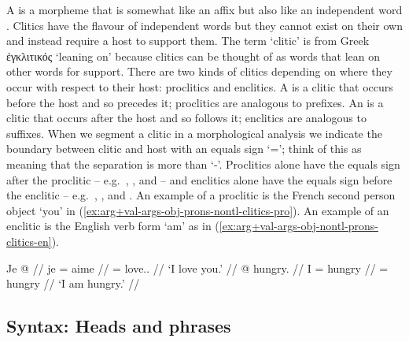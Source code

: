 A  is a morpheme that is somewhat like an affix but also like an independent word \parencite[166]{booij:2007}. Clitics have the flavour of independent words but they cannot exist on their own and instead require a host to support them. The term ‘clitic’ is from Greek ἐγκλιτικός  ‘leaning on’ because clitics can be thought of as words that lean on other words for support. There are two kinds of clitics depending on where they occur with respect to their host: proclitics and enclitics. A  is a clitic that occurs before the host and so precedes it; proclitics are analogous to prefixes. An  is a clitic that occurs after the host and so follows it; enclitics are analogous to suffixes. When we segment a clitic in a morphological analysis we indicate the boundary between clitic and host with an equals sign ‘=’; think of this as meaning that the separation is more than ‘-’. Proclitics alone have the equals sign after the proclitic – e.g.\ , , and  – and enclitics alone have the equals sign before the enclitic – e.g.\ , , and . An example of a proclitic is the French second person object  ‘you’ in (\ref{ex:arg+val-args-obj-prons-nontl-clitics-pro}). An example of an enclitic is the English verb form  ‘am’ as in (\ref{ex:arg+val-args-obj-nontl-prons-clitics-en}).

\pex\label{exx:arg+val-args-obj-prons-nontl-clitics}%
\a\label{ex:arg+val-args-obj-prons-nontl-clitics-pro}%
%
\begingl
	\gla	Je  @ {} //
	\glb	je = aime //
	\glc	{} = love.. //
	\glft	‘I love you.’
		//
\endgl
\a\label{ex:arg+val-args-obj-nontl-prons-clitics-en}%
%
\begingl
	\gla	{} @ {} hungry. //
	\glb	I = hungry //
	\glc	{} = hungry //
	\glft	‘I am hungry.’
		//
\endgl
\xe


\subsection{Syntax: Heads and phrases}\label{sec:intro-ling-synx}




